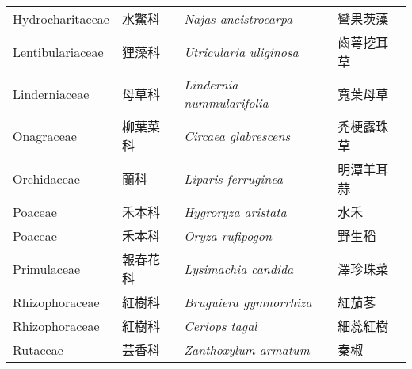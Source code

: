 \begin{longtable}{p{3cm}p{2cm}p{5cm}p{3cm}}
    Hydrocharitaceae & 水鱉科 & \textit{Najas ancistrocarpa}  \index{Najas@\textit{Najas}!ancistrocarpa@\textit{ancistrocarpa}}   & 彎果茨藻 \index{彎果茨藻} \\
    Lentibulariaceae & 狸藻科 & \textit{Utricularia uliginosa}  \index{Utricularia@\textit{Utricularia}!uliginosa@\textit{uliginosa}} & 齒萼挖耳草 \index{齒萼挖耳草} \\
    Linderniaceae & 母草科 & \textit{Lindernia nummularifolia}  \index{Lindernia@\textit{Lindernia}!nummularifolia@\textit{nummularifolia}} & 寬葉母草 \index{寬葉母草} \\
    Onagraceae & 柳葉菜科 & \textit{Circaea glabrescens}  \index{Circaea@\textit{Circaea}!glabrescens@\textit{glabrescens}}       & 禿梗露珠草 \index{禿梗露珠草} \\
    Orchidaceae & 蘭科 & \textit{Liparis ferruginea}  \index{Liparis@\textit{Liparis}!ferruginea@\textit{ferruginea}}           & 明潭羊耳蒜 \index{明潭羊耳蒜} \\
    Poaceae & 禾本科 & \textit{Hygroryza aristata}  \index{Hygroryza@\textit{Hygroryza}!aristata@\textit{aristata}}             & 水禾 \index{水禾} \\
    Poaceae & 禾本科 & \textit{Oryza rufipogon}  \index{Oryza@\textit{Oryza}!rufipogon@\textit{rufipogon}}                & 野生稻 \index{野生稻} \\
    Primulaceae & 報春花科 & \textit{Lysimachia candida}  \index{Lysimachia@\textit{Lysimachia}!candida@\textit{candida}}       & 澤珍珠菜 \index{澤珍珠菜} \\
    Rhizophoraceae & 紅樹科 & \textit{Bruguiera gymnorrhiza}  \index{Bruguiera@\textit{Bruguiera}!gymnorrhiza@\textit{gymnorrhiza}}   & 紅茄苳 \index{紅茄苳} \\
    Rhizophoraceae & 紅樹科 & \textit{Ceriops tagal}  \index{Ceriops@\textit{Ceriops}!tagal@\textit{tagal}}           & 細蕊紅樹 \index{細蕊紅樹} \\
    Rutaceae & 芸香科 & \textit{Zanthoxylum armatum}  \index{Zanthoxylum@\textit{Zanthoxylum}!armatum@\textit{armatum}}           & 秦椒 \index{秦椒} \\
    \bottomrule
    \end{longtable}
